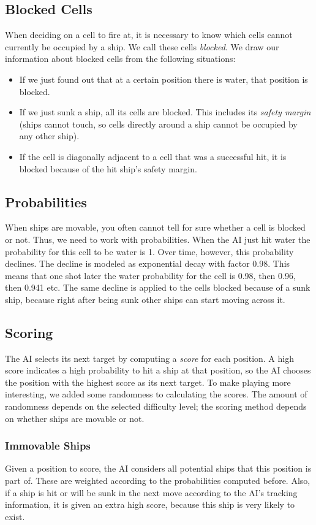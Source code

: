 \documentclass[a4paper]{easychair}
\begin{document}
\subsection{Blocked Cells}
When deciding on a cell to fire at, it is necessary to know which cells cannot currently be occupied by a ship. We call these cells \emph{blocked}. 
We draw our information about blocked cells from the following situations:
\begin{itemize}
 \item 
 If we just found out that at a certain position there is water, that position is blocked.
 \item
 If we just sunk a ship, all its cells are blocked. This includes its \emph{safety margin} (ships cannot touch, so cells directly around a ship cannot be occupied by any other ship).
 \item 
 If the cell is diagonally adjacent to a cell that was a successful hit, it is blocked because of the hit ship's safety margin.
\end{itemize}

\subsection{Probabilities}
When ships are movable, you often cannot tell for sure whether a cell is blocked or not. Thus, we need to work with probabilities. When the AI just hit water the probability for this cell to be water is 1. Over time, however, this probability declines. The decline is modeled as exponential decay with factor 0.98. This means that one shot later the water probability for the cell is 0.98, then 0.96, then 0.941 etc. The same decline is applied to the cells blocked because of a sunk ship, because right after being sunk other ships can start moving across it.

\subsection{Scoring}
The AI selects its next target by computing a \emph{score} for each position. A high score indicates a high probability to hit a ship at that position, so the AI chooses the position with the highest score as its next target. To make playing more interesting, we added some randomness to calculating the scores. The amount of randomness depends on the selected difficulty level; the scoring method depends on whether ships are movable or not.

\subsubsection{Immovable Ships} Given a position to score, the AI considers all potential ships that this position is part of. These are weighted according to the probabilities computed before. Also, if a ship is hit or will be sunk in the next move according to the AI's tracking information, it is given an extra high score, because this ship is very likely to exist.
\end{document}
